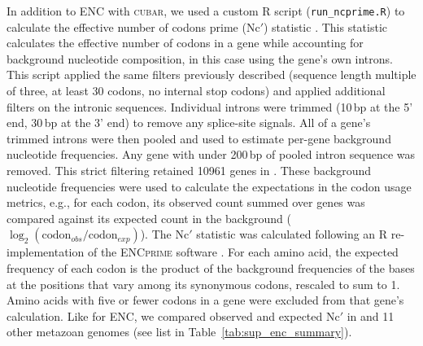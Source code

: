 In addition to ENC with \textsc{cubar}, we used a custom R script (\texttt{run\_ncprime.R})
to calculate the effective number of codons prime (Nc$'$) statistic \citep{novembre_2002_encprime}.
This statistic calculates the effective number of codons in a gene while accounting for
background nucleotide composition, in this case using the gene's own introns.
This script applied the same filters previously described (sequence length multiple of three,
at least 30 codons, no internal stop codons) and applied additional filters on the intronic
sequences.
Individual introns were trimmed (10\,bp at the 5' end, 30\,bp at the 3' end) to remove any
splice-site signals.
All of a gene's trimmed introns were then pooled and used to estimate per-gene background
nucleotide frequencies.
Any gene with under 200\,bp of pooled intron sequence was removed.
This strict filtering retained \num{10961} genes in \bgla{}.
These background nucleotide frequencies were used to calculate the expectations in the codon
usage metrics, e.g., for each codon, its observed count summed over genes was compared against
its expected count in the background ($\log_2(\text{codon}_{obs}/\text{codon}_{exp})$).
The Nc$'$ statistic was calculated following an R re-implementation of the \textsc{ENCprime}
software \citep{novembre_2002_encprime}.
For each amino acid, the expected frequency of each codon is the product of the background
frequencies of the bases at the positions that vary among its synonymous codons, rescaled to
sum to 1.
Amino acids with five or fewer codons in a gene were excluded from that gene's calculation.
Like for ENC, we compared observed and expected Nc$'$ in \bgla{} and 11 other metazoan
genomes (see list in Table~\ref{tab:sup_enc_summary}).
\vspace{0.1cm}

